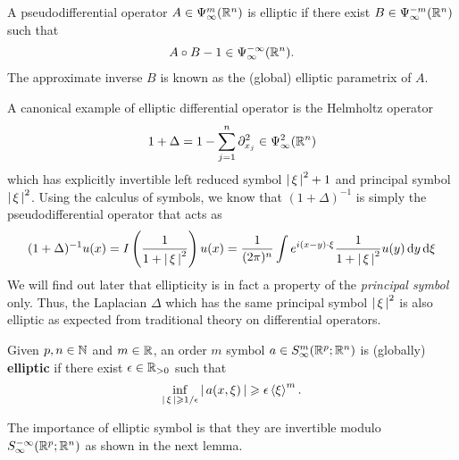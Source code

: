 \documentclass[12pt]{article}
\begin{document}
\begin{fdefinition}
    A pseudodifferential operator $A \in \Psi^{m}_{\infty}(\R^n)$ is elliptic if there exist $B \in \Psi^{-m}_{\infty}(\R^n)$ such that 
    \begin{align*}
    A \circ B - 1 \in \Psi^{-\infty}_{\infty}(\R^n). 
    \end{align*}
    The approximate inverse $B$ is known as the (global) elliptic parametrix of $A$. 
\end{fdefinition}

A canonical example of elliptic differential operator is the Helmholtz operator 
\begin{align*}
1  + \Delta = 1 - \sum_{j = 1}^ n \p_{x_j}^2 \in \Psi^{2}_{\infty}(\R^n)
\end{align*}
which has explicitly invertible left reduced symbol $\abs{\xi}^2 + 1$ and principal symbol $\abs{\xi}^2$. Using the calculus of symbols, we know that $(1 + \Delta)^{-1}$ is simply the pseudodifferential operator that acts as 
\begin{align*}
(1 + \Delta)^{-1} u(x) = I\brac{\frac{1}{1 + \abs{\xi}^2} } u(x) = \frac{1}{(2\pi)^n} \int e^{i(x - y) \cdot \xi} \frac{1}{1 + \abs{\xi}^2} u(y) \d[y] \d[\xi]
\end{align*}
We will find out later that ellipticity is in fact a property of the \textit{principal symbol} only. Thus, the Laplacian $\Delta$ which has the same principal symbol $\abs{\xi}^2$ is also elliptic as expected from traditional theory on differential operators. 



\begin{fdefinition}
    Given $p, n \in \N$ and $m \in \R$, an order $m$ symbol $a \in S^m_\infty(\R^p; \R^n)$ is (globally) \textbf{elliptic} if there exist $\epsilon \in \R_{>0}$ such that 
    \[
    \inf_{\abs{\xi} \geq 1/\epsilon} \abs{a(x, \xi)} \geq \epsilon \sym[\xi]^m. 
    \]
\end{fdefinition}

The importance of elliptic symbol is that they are invertible modulo $S^{-\infty}_\infty(\R^p; \R^n)$ as shown in the next lemma. 
\end{document}
